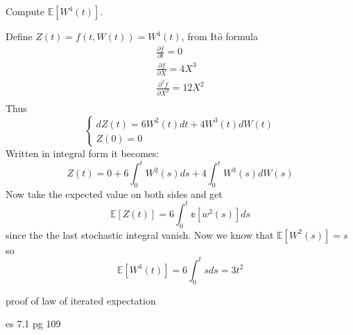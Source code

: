 \documentclass[11pt,a4paper]{report}
\begin{document}
\begin{questions}
\question
Compute $\mathbb{E}[W^4(t)]$.

\begin{solution}
Define $Z(t) = f(t, W(t)) = W^4(t)$, from It$\hat{o}$ formula
\begin{equation*}
	\begin{gathered}
		\frac{\partial f}{\partial t} = 0\\
		\frac{\partial f}{\partial X} = 4X^3\\
		\frac{\partial^2 f}{\partial X^2} = 12X^2\\
	\end{gathered}
\end{equation*}
Thus 
\begin{equation*}
	\begin{cases}
		dZ(t) = 6W^2(t)dt + 4W^3(t)dW(t) \\
		Z(0) = 0
	\end{cases}
\end{equation*}
Written in integral form it becomes:
\begin{equation*}
Z(t) = 0 + 6\int_0^t W^2(s)ds + 4\int_0^t W^3(s)dW(s)
\end{equation*}
Now take the expected value on both sides and get
\begin{equation*}
	\mathbb{E}[Z(t)] = 6\int_0^t\mathbb{e}[w^2(s)]ds
\end{equation*}
since the the last stochastic integral vanish. Now we know that $\mathbb{E}[W^2(s)]=s$ so
\begin{equation*}
\mathbb{E}[W^4(t)] = 6\int_0^t s ds = 3t^2
\end{equation*}
\end{solution}
\end{questions}
	
proof of law of iterated expectation

es 7.1 pg 109
\end{document}
